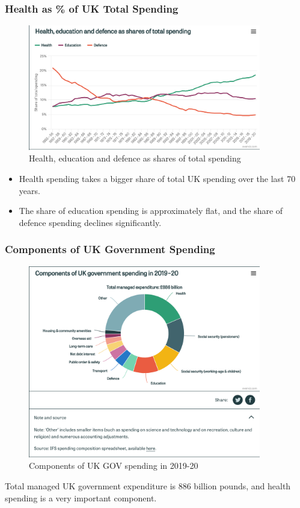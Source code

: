         \subsubsection{Health as \% of UK Total Spending}  
            \begin{figure}[H]
                \centering
                \includegraphics[width=4in]{images/ch3/4.png}
                \caption{Health, education and defence as shares of total spending}
            \end{figure} 
        \begin{itemize}           
            \item Health spending takes a bigger share of total UK spending over the last 70 years.
            \item The share of education spending is approximately flat, and the share of defence spending declines significantly.
        \end{itemize}
        
        \subsubsection{Components of UK Government Spending}  
            \begin{figure}[H]
                \centering
                \includegraphics[width=4in]{images/ch3/5.png}
                \caption{Components of UK GOV spending in 2019-20}
            \end{figure} 
            Total managed UK government expenditure is 886 billion pounds, and health spending is a very important component.

